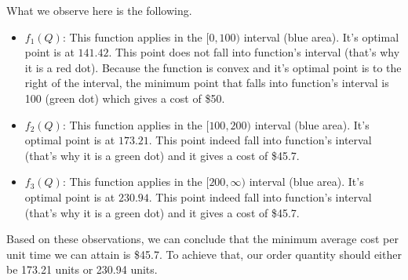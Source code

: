 \begin{exercise}
\begin{solution}
What we observe here is the following.
\begin{itemize}
\item $f_1(Q)$: This function applies in the $[0,100)$ interval (blue area). It's optimal point is at $141.42$. This point does not fall into function's interval (that's why it is a red dot). Because the function is convex and it's optimal point is to the right of the interval, the minimum point that falls into function's interval is 100 (green dot) which gives a cost of \$50. 
\item $f_2(Q)$: This function applies in the $[100,200)$ interval (blue area). It's optimal point is at $173.21$. This point indeed fall into function's interval (that's why it is a green dot) and it gives a cost of \$45.7. 
\item $f_3(Q)$: This function applies in the $[200,\infty)$ interval (blue area). It's optimal point is at $230.94$. This point indeed fall into function's interval (that's why it is a green dot) and it gives a cost of \$45.7.  
\end{itemize}

Based on these observations, we can conclude that the minimum average cost per unit time we can attain is \$45.7. To achieve that, our order quantity should either be 173.21 units or 230.94 units.
\end{solution}
\end{exercise}

